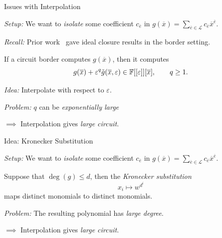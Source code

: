 \documentclass[aspectratio=169]{beamer}
\begin{document}
\begin{frame}{Issues with Interpolation}

  \emph{Setup:} We want to \emph{isolate} some coefficient $c_{\overline{e}}$ in $g(\overline{x}) = \sum_{\overline{e} \in \mathcal{L}} c_{\overline{e}} {\overline{x}}^{\overline{e}}$.

  \pause

  \emph{Recall:} Prior work~\cite{AF22} gave ideal closure results in the border setting.

    If a circuit border computes $g(\overline{x})$, then it computes
    \[
      g(\overline{x}) + \varepsilon^q \tilde{g}(\overline{x}, \varepsilon) \in \mathbb{F}[[\varepsilon]][\overline{x}], \qquad q \geq 1.
    \]

    \pause
    \vspace{10pt}
    
    \emph{Idea:} Interpolate with respect to $\varepsilon$.
    
    \pause
    \vspace{10pt}
    
    \emph{Problem:} $q$ can be \emph{exponentially large}

    \pause
    
    \qquad $\implies$ Interpolation gives \emph{large circuit}.
\end{frame}

\begin{frame}{Idea: Kronecker Substitution}

  \emph{Setup:} We want to \emph{isolate} some coefficient $c_{\overline{e}}$ in $g(\overline{x}) = \sum_{\overline{e} \in \mathcal{L}} c_{\overline{e}} {\overline{x}}^{\overline{e}}$.

  \pause

  \begin{lem}
    Suppose that $\deg(g) \leq d$\pause, then the \emph{Kronecker substitution}
    \[
      x_i \mapsto w^{d^i}
    \]
    maps distinct monomials to distinct monomials.
  \end{lem}

  \pause

  \emph{Problem:} The resulting polynomial has \emph{large degree}.

  \pause

  \qquad $\implies$ Interpolation gives \emph{large circuit}.
\end{frame}
\end{document}
